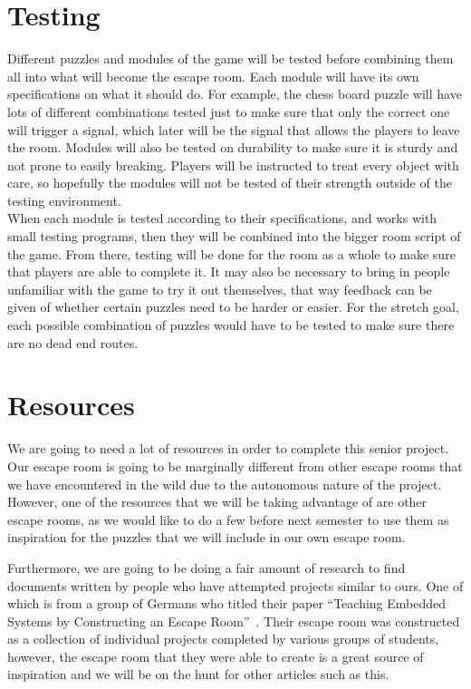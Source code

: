 \documentclass[conference]{IEEEtran}
\begin{document}
\section{Testing}
Different puzzles and modules of the game will be tested before combining
them all into what will become the escape room. Each module will have its
own specifications on what it should do. For example, the chess board puzzle
will have lots of different combinations tested just to make sure that only
the correct one will trigger a signal, which later will be the signal that
allows the players to leave the room. Modules will also be tested on
durability to make sure it is sturdy and not prone to easily breaking.
Players will be instructed to treat every object with care, so hopefully
the modules will not be tested of their strength outside of the testing
environment.
\\
\indent When each module is tested according to their specifications, and works
with small testing programs, then they will be combined into the bigger
room script of the game. From there, testing will be done for the room
as a whole to make sure that players are able to complete it. It may also
be necessary to bring in people unfamiliar with the game to try it out
themselves, that way feedback can be given of whether certain puzzles
need to be harder or easier. For the stretch goal, each possible combination
of puzzles would have to be tested to make sure there are no dead end routes.

\section{Resources}
We are going to need a lot of resources in order to complete this senior project.
Our escape room is going to be marginally different from other escape rooms that we have
encountered in the wild due to the autonomous nature of the project. However,
one of the resources that we will be taking advantage of are other escape rooms,
as we would like to do a few before next semester to use them as inspiration for
the puzzles that we will include in our own escape room.

Furthermore, we are going to
be doing a fair amount of research to find documents written by people who have attempted
projects similar to ours. One of which is from a group of Germans who titled their paper
``Teaching Embedded Systems by Constructing an Escape Room''~\cite{germanEscapeRoom}. Their
escape room was constructed as a collection of individual projects completed by various groups
of students, however, the escape room that they were able to create is a great source
of inspiration and we will be on the hunt for other articles such as this.
\end{document}
